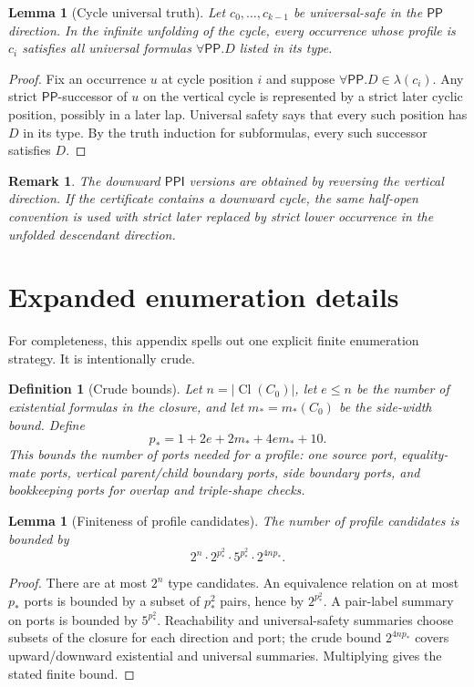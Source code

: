 \documentclass[11pt]{article}
\newtheorem{lemma}[theorem]{Lemma}
\newtheorem{definition}[theorem]{Definition}
\newtheorem{remark}[theorem]{Remark}
\newcommand{\PP}{\mathsf{PP}}
\newcommand{\PPI}{\mathsf{PPI}}
\newcommand{\Cl}{\operatorname{Cl}}
\begin{document}
\begin{lemma}[Cycle universal truth]
Let $c_0,\ldots,c_{k-1}$ be universal-safe in the $\PP$ direction.  In the infinite unfolding of the cycle, every occurrence whose profile is $c_i$ satisfies all universal formulas $\forall\PP.D$ listed in its type.
\end{lemma}

\begin{proof}
Fix an occurrence $u$ at cycle position $i$ and suppose $\forall\PP.D\in\lambda(c_i)$.  Any strict $\PP$-successor of $u$ on the vertical cycle is represented by a strict later cyclic position, possibly in a later lap.  Universal safety says that every such position has $D$ in its type.  By the truth induction for subformulas, every such successor satisfies $D$.
\end{proof}

\begin{remark}
The downward $\PPI$ versions are obtained by reversing the vertical direction.  If the certificate contains a downward cycle, the same half-open convention is used with strict later replaced by strict lower occurrence in the unfolded descendant direction.
\end{remark}

\section{Expanded enumeration details}

For completeness, this appendix spells out one explicit finite enumeration strategy.  It is intentionally crude.

\begin{definition}[Crude bounds]
Let $n=|\Cl(C_0)|$, let $e\le n$ be the number of existential formulas in the closure, and let $m_*=m_*(C_0)$ be the side-width bound.  Define
\[
  p_*=1+2e+2m_*+4e m_*+10.
\]
This bounds the number of ports needed for a profile: one source port, equality-mate ports, vertical parent/child boundary ports, side boundary ports, and bookkeeping ports for overlap and triple-shape checks.
\end{definition}

\begin{lemma}[Finiteness of profile candidates]
The number of profile candidates is bounded by
\[
  2^n\cdot 2^{p_*^2}\cdot 5^{p_*^2}\cdot 2^{4np_*}.
\]
\end{lemma}

\begin{proof}
There are at most $2^n$ type candidates.  An equivalence relation on at most $p_*$ ports is bounded by a subset of $p_*^2$ pairs, hence by $2^{p_*^2}$.  A pair-label summary on ports is bounded by $5^{p_*^2}$.  Reachability and universal-safety summaries choose subsets of the closure for each direction and port; the crude bound $2^{4np_*}$ covers upward/downward existential and universal summaries.  Multiplying gives the stated finite bound.
\end{proof}
\end{document}
